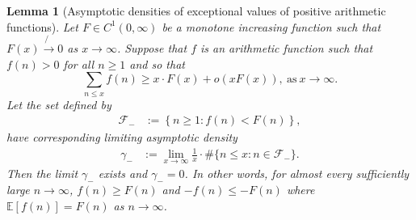 \documentclass[11pt,reqno,a4letter]{article}
\numberwithin{figure}{section}
\numberwithin{table}{section}
\theoremstyle{plain}
\newtheorem{lemma}[theorem]{Lemma}
\numberwithin{theorem}{section}
\theoremstyle{definition}
\begin{document}
\begin{lemma}[Asymptotic densities of exceptional values of positive arithmetic functions] 
\label{lemma_AsymptoticDensitiesOfExceptionalSets_v1}
\label{remark_AsymptoticDensitiesOfExceptionalSets_v1}
Let $F \in C^{1}(0, \infty)$ be a monotone increasing function such that 
$F(x) \not{\rightarrow} 0$ as $x \rightarrow \infty$. 
Suppose that $f$ is an arithmetic function such that $f(n) > 0$ for all $n \geq 1$ and so that 
\[
\sum_{n \leq x} f(n) \geq x \cdot F(x) + o(xF(x)), \mathrm{\ as\ } x \rightarrow \infty. 
\]
Let the set defined by 
\begin{align*} 
\mathcal{F}_{-} & := \left\{n \geq 1: f(n) < F(n)\right\}, 
\end{align*} 
have corresponding limiting asymptotic density
\begin{align*} 
\gamma_{-} & := \lim_{x \rightarrow \infty} \frac{1}{x} \cdot \#\{n \leq x: n \in \mathcal{F}_{-}\}. 
\end{align*} 
Then the limit $\gamma_{-}$ exists and $\gamma_{-} = 0$. 
In other words, for almost every sufficiently large $n \rightarrow \infty$, 
$f(n) \geq F(n)$ and $-f(n) \leq -F(n)$ where $\mathbb{E}[f(n)] = F(n)$ as $n \rightarrow \infty$. 
\end{lemma} 
\end{document}
